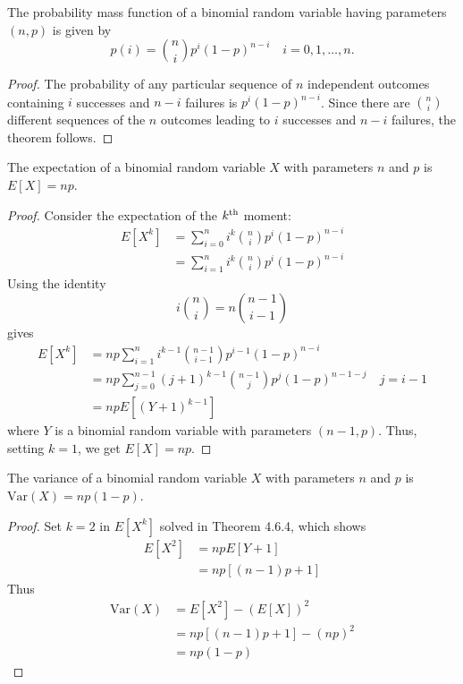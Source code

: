 \documentclass[a4paper,8pt]{article}
\begin{document}
\begin{outline}
    The probability mass function of a binomial random variable having parameters \((n, p)\) is given by
    \[ p(i) = \binom{n}{i}p^i(1-p)^{n-i}\quad i=0,1,\ldots,n\text{.} \]

    \begin{proof}
      The probability of any particular sequence of \(n\) independent outcomes containing \(i\) successes and
      \(n-i\) failures is \(p^i(1-p)^{n-i}\). Since there are \(\binom{n}{i}\) different sequences of the \(n\)
      outcomes leading to \(i\) successes and \(n-i\) failures, the theorem follows.
    \end{proof}

    The expectation of a binomial random variable \(X\) with parameters \(n\) and \(p\) is \(E[X] = np\).

    \begin{proof}
      Consider the expectation of the \(k\textsuperscript{th}\) moment:
      \begin{align*}
        E[X^k] &= \sum_{i=0}^ni^k\binom{n}{i}p^i(1-p)^{n-i} \\
               &= \sum_{i=1}^ni^k\binom{n}{i}p^i(1-p)^{n-i}
      \end{align*}
      Using the identity \[ i\binom{n}{i} = n\binom{n-1}{i-1}\] gives
      \begin{align*}
        E[X^k] &= np\sum_{i=1}^ni^{k-1}\binom{n-1}{i-1}p^{i-1}(1-p)^{n-i} \\
               &= np\sum_{j=0}^{n-1}(j+1)^{k-1}\binom{n-1}{j}p^j(1-p)^{n-1-j}\quad j=i-1 \\
               &= npE[(Y+1)^{k-1}]
      \end{align*}
      where \(Y\) is a binomial random variable with parameters \((n-1, p)\). Thus,
      setting \(k=1\), we get \(E[X] = np\).
    \end{proof}

    The variance of a binomial random variable \(X\) with parameters \(n\) and \(p\) is \(\text{Var}(X) = np(1-p)\).

    \begin{proof}
      Set \(k = 2\) in \(E[X^k]\) solved in Theorem 4.6.4, which shows
      \begin{align*}
        E[X^2] &= npE[Y+1] \\
               &= np[(n-1)p + 1]
      \end{align*}
      Thus
      \begin{align*}
        \text{Var}(X) &= E[X^2] - (E[X])^2 \\
                      &= np[(n-1)p+1] - (np)^2 \\
                      &= np(1-p)
      \end{align*}
    \end{proof}


\end{outline}
\end{document}

